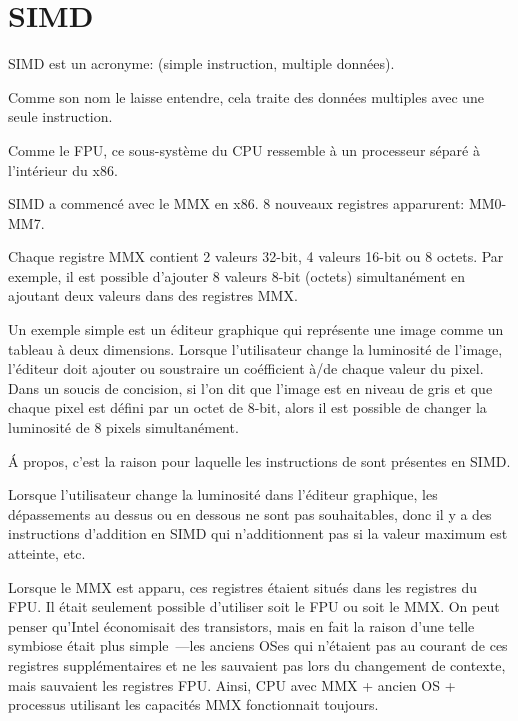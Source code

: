 \section{SIMD}

\label{SIMD_x86}
\ac{SIMD} est un acronyme:  (simple instruction, multiple données).

Comme son nom le laisse entendre, cela traite des données multiples avec une seule
instruction.

Comme le \ac{FPU}, ce sous-système du \ac{CPU} ressemble à un processeur séparé à
l'intérieur du x86.


SIMD a commencé avec le MMX en x86. 8 nouveaux registres apparurent: MM0-MM7.

Chaque registre MMX contient 2 valeurs 32-bit, 4 valeurs 16-bit ou 8 octets.
Par exemple, il est possible d'ajouter 8 valeurs 8-bit (octets) simultanément en
ajoutant deux valeurs dans des registres MMX.

Un exemple simple est un éditeur graphique qui représente une image comme un tableau
à deux dimensions.
Lorsque l'utilisateur change la luminosité de l'image, l'éditeur doit ajouter ou
soustraire un coéfficient à/de chaque valeur du pixel.
Dans un soucis de concision, si l'on dit que l'image est en niveau de gris et que
chaque pixel est défini par un octet de 8-bit, alors il est possible de changer la
luminosité de 8 pixels simultanément.

Á propos, c'est la raison pour laquelle les instructions de  sont
présentes en SIMD.

Lorsque l'utilisateur change la luminosité dans l'éditeur graphique, les dépassements
au dessus ou en dessous ne sont pas souhaitables, donc il y a des instructions d'addition
en SIMD qui n'additionnent pas si la valeur maximum est atteinte, etc.

Lorsque le MMX est apparu, ces registres étaient situés dans les registres du FPU.
Il était seulement possible d'utiliser soit le FPU ou soit le MMX. On peut penser
qu'Intel économisait des transistors, mais en fait la raison d'une telle symbiose
était plus simple~---les anciens \ac{OS}es qui n'étaient pas au courant de ces registres
supplémentaires et ne les sauvaient pas lors du changement de contexte, mais sauvaient
les registres FPU.
Ainsi, CPU avec MMX + ancien \ac{OS} + processus utilisant les capacités MMX fonctionnait
toujours.

